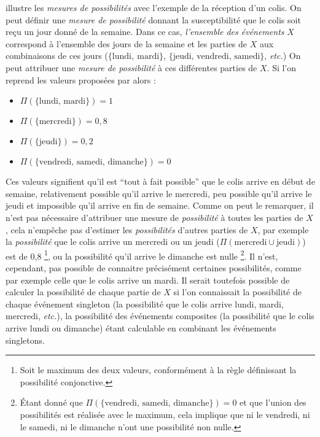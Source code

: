 \textcite{Bouchon-Meunier1995} illustre les \emph{mesures de
  possibilités} avec l'exemple de la réception d'un colis. On peut
définir une \emph{mesure de possibilité} donnant la susceptibilité que
le colis soit reçu un jour donné de la semaine. Dans ce cas,
\emph{l'ensemble des événements} \(X\) correspond à l'ensemble des
jours de la semaine et les parties de \(X\) aux combinaisons de ces
jours (\eg \(\{\text{lundi},\ \text{mardi}\}\),
\(\{\text{jeudi, vendredi, samedi}\}\), \emph{etc.})  On peut
attribuer une \emph{mesure de possibilité} à ces différentes parties
de \(X\). Si l'on reprend les valeurs proposées par
\textcite{Bouchon-Meunier1995} alors :
% 
\begin{itemize}
\item \(\Pi(\{\text{lundi, mardi}\})=1\)
\item \(\Pi(\{\text{mercredi}\})=0,8\)
\item \(\Pi(\{\text{jeudi}\})=0,2\)
\item \(\Pi(\{\text{vendredi, samedi, dimanche}\})=0\)
\end{itemize}
%
Ces valeurs signifient qu'il est \enquote{tout à fait possible} que le
colis arrive en début de semaine, relativement possible qu'il arrive
le mercredi, peu possible qu'il arrive le jeudi et impossible qu'il
arrive en fin de semaine. Comme on peut le remarquer, il n'est pas
nécessaire d'attribuer une mesure de \emph{possibilité} à toutes les
parties de \(X\), cela n'empêche pas d'estimer les \emph{possibilités}
d'autres parties de \(X\), par exemple la \emph{possibilité} que le
colis arrive un mercredi ou un jeudi
(\(\Pi(\text{mercredi} \cup \text{jeudi})\)) est de 0,8 \footnote{Soit
  le maximum des deux valeurs, conformément à la règle définissant la
  possibilité conjonctive.}, ou la possibilité qu'il arrive le
dimanche est nulle \footnote{Étant donné que
  \(\Pi(\{\text{vendredi, samedi, dimanche}\})=0\) et que l'union des
  possibilités est réalisée avec le maximum, cela implique que ni le
  vendredi, ni le samedi, ni le dimanche n'ont une possibilité non
  nulle.}. Il n'est, cependant, pas possible de connaitre précisément
certaines possibilités, comme par exemple celle que le colis arrive un
mardi. Il serait toutefois possible de calculer la possibilité de
chaque partie de \(X\) si l'on connaissait la possibilité de chaque
événement singleton (\ie la possibilité que le colis arrive lundi,
mardi, mercredi, \emph{etc.}), la possibilité des événements
composites (\eg la possibilité que le colis arrive lundi ou dimanche)
étant calculable en combinant les événements singletons.

